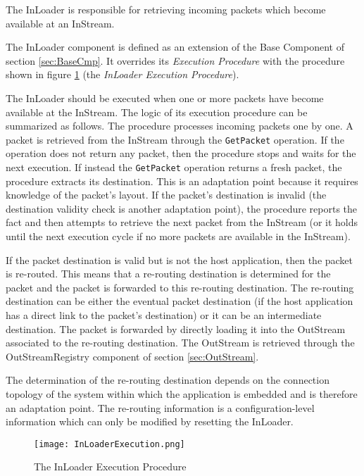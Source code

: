 The InLoader is responsible for retrieving incoming packets which become available at an InStream. 

The InLoader component is defined as an extension of the Base Component of section \ref{sec:BaseCmp}.  It overrides its \textit{Execution Procedure} with the procedure shown in figure \ref{fig:InLoaderExecution} (the \textit{InLoader Execution Procedure}). 

The InLoader should be executed when one or more packets have become available at the InStream. The logic of its execution procedure can be summarized as follows.
The procedure processes incoming packets one by one. A packet is retrieved from the InStream through the \texttt{GetPacket} operation. If the operation does not return any packet, then the procedure stops and waits for the next execution. If instead the \texttt{GetPacket} operation returns a fresh packet, the procedure extracts its destination. This is an adaptation point because it requires knowledge of the packet's layout. If the packet's destination is invalid (the destination validity check is another adaptation point), the procedure reports the fact and then attempts to retrieve the next packet from the InStream (or it holds until the next execution cycle if no more packets are available in the InStream).

If the packet destination is valid but is not the host application, then the packet is re-routed. This means that a re-routing destination is determined for the packet and the packet is forwarded to this re-routing destination. The re-routing destination can be either the eventual packet destination (if the host application has a direct link to the packet's destination) or it can be an intermediate destination. The packet is forwarded by directly loading it into the OutStream associated to the re-routing destination. The OutStream is retrieved through the OutStreamRegistry component of section \ref{sec:OutStream}. 

The determination of the re-routing destination depends on the connection topology of the system within which the application is embedded and is therefore an adaptation point. The re-routing information is a configuration-level information which can only be modified by resetting the InLoader.

\begin{figure}[h]
 \centering
 \texttt{[image: InLoaderExecution.png]}
 \caption{The InLoader Execution Procedure}
 \label{fig:InLoaderExecution}
\end{figure}

